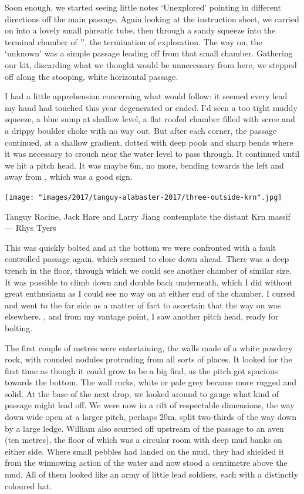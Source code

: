 Soon enough, we started seeing little notes ‘Unexplored’ pointing in different directions off the main passage.  Again looking at the instruction sheet, we carried on into a lovely small phreatic tube, then through a sandy squeeze into the terminal chamber of '', the termination of exploration. The way on, the ‘unknown’ was a simple passage leading off from that small chamber. Gathering our kit, discarding what we thought would be unnecessary from here, we stepped off along the stooping, white horizontal passage. 

I had a little apprehension concerning what would follow: it seemed every lead my hand had touched this year degenerated or ended. I’d seen a too tight muddy squeeze, a blue sump at shallow level, a flat roofed chamber filled with scree and a drippy boulder choke with no way out. But after each corner, the passage continued, at a shallow gradient, dotted with deep pools and sharp bends where it was necessary to crouch near the water level to pass through. It continued until we hit a pitch head. It was maybe 6m, no more, bending towards the left and away from , which was a good sign. 

\begin{pagefigure} \centering
\texttt{[image: "images/2017/tanguy-alabaster-2017/three-outside-krn".jpg]}
\caption{Tanguy Racine, Jack Hare and Larry Jiang contemplate the distant Krn massif --- Rhys Tyers}
\end{pagefigure}

This was quickly bolted and at the bottom we were confronted with a fault controlled passage again, which seemed to close down ahead. There was a deep trench in the floor, through which we could see another chamber of similar size. It was possible to climb down and double back underneath, which I did without great enthusiasm as I could see no way on at either end of the chamber. I cursed and went to the far side as a matter of fact to ascertain that the way on was elsewhere. , and from my vantage point, I saw another pitch head, ready for bolting. 

The first couple of metres were entertaining, the walls made of a white powdery rock, with rounded nodules protruding from all sorts of places. It looked for the first time as though it could grow to be a big find, as the pitch got spacious towards the bottom. The wall rocks, white or pale grey became more rugged and solid. At the base of the next drop, we looked around to gauge what kind of passage might lead off. We were now in a rift of respectable dimensions, the way down wide open at a larger pitch, perhaps 20m, split two-thirds of the way down by a large ledge. William also scurried off upstream of the passage to an aven (ten metres), the floor of which was a circular room with deep mud banks on either side. Where small pebbles had landed on the mud, they had shielded it from the winnowing action of the water and now stood a centimetre above the mud. All of them looked like an army of little lead soldiers, each with a distinctly coloured hat. 




